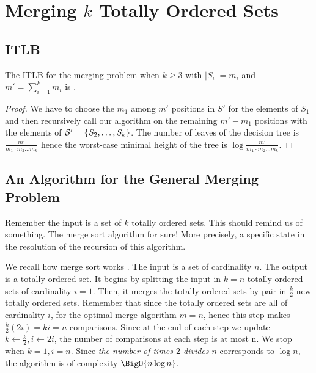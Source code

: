 \section{Merging $k$ Totally Ordered Sets}
\label{tree:merging:kgeq3}


\subsection*{ITLB}
\label{tree:merging:kgeq3:ITLB}


\begin{theorem}
The ITLB for the merging problem when $k \geq 3$ with $|S_i| = m_i$ and $m' =
\sum_{i=1}^{k} m_i$ is .
\end{theorem}

\begin{proof}
We have to choose the $m_1$ among $m'$ positions in $S'$ for the elements of
$S_1$ and then recursively call our algorithm on the remaining $m' - m_1$
positions with the elements of ${\cal S}' = \{S_2, \dots, S_k\}$. The number of
leaves of the decision tree is $\frac{m'}{m_1 \cdot m_2 \dots m_k}$ hence the
worst-case minimal height of the tree is $\log \frac{m'}{m_1 \cdot m_2 \dots
m_k}$.
\end{proof}


\subsection*{An Algorithm for the General Merging Problem}
\label{tree:merging:kgeq3:alg}

Remember the input is a set of $k$ totally ordered sets. This should remind us
of something. The merge sort algorithm for sure! More precisely, a specific
state in the resolution of the recursion of this algorithm.

We recall how merge sort works \cite{leiserson2001introduction}. The input is a
set of cardinality $n$. The output is a totally ordered set. It begins by
splitting the input in $k = n$ totally ordered sets of cardinality $i = 1$.
Then, it merges the totally ordered sets by pair in $\frac{k}{2}$ new totally
ordered sets. Remember that since the totally ordered sets are all of
cardinality $i$, for the optimal merge algorithm $m=n$, hence this step makes
$\frac{k}{2} (2 i) = k i = n$ comparisons. Since at the end of each step we
update $k \gets \frac{k}{2}, i \gets 2i$, the number of comparisons at each
step is at most n. We stop when $k = 1, i = n$.
Since \emph{the number of times $2$ divides $n$} corresponds to $\log n$, the
algorithm is of complexity $\BigO{n \log n}$.


